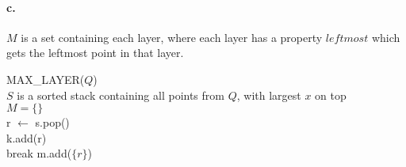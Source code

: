 \paragraph{c.}
$M$ is a set containing each layer, where each layer has a property $leftmost$ which gets the leftmost point in that layer.


\begin{algorithm}[H]
MAX\_LAYER($Q$) \\
$S$ is a sorted stack containing all points from $Q$, with largest $x$ on top \\
$M = \{ \}$ \\
{
	r $\leftarrow$ s.pop() \\
	{
		{
			k.add(r) \\
			break
		}
	}
	m.add($\{r\}$)
}
\end{algorithm}

